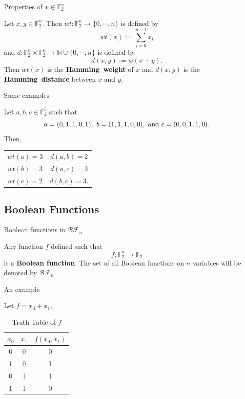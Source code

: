 \documentclass{beamer}
\def\gftwo{\mathbb{F}_2}
\def\nnn{\mathbb{N}}
\def\BF{\mathcal{BF}}
\begin{document}
\begin{frame}{Properties of $x\in\gftwo^n$}
  \begin{definition}
  \label{def:Hamming}
  	Let $x,y\in\gftwo^n$. Then $wt:\gftwo^n\rightarrow\{0,\cdots,n\}$
    is defined by
  	\[
  	  wt(x):=\sum_{i=0}^{n-1}x_i
  	\]
  	and $d:\gftwo^n\times\gftwo^n\rightarrow\nnn\cup\{0,\cdots,n\}$
    is defined by
  	\[
  	  d(x,y):=w(x+y).
  	\]
  	Then $wt(x)$ is the {\bf Hamming\ weight} of $x$ and $d(x,y)$ is the
  	{\bf Hamming\ distance} between $x$ and $y$.
  \end{definition}
\end{frame}
  
\begin{frame}{Some examples}
  \begin{example}
  	Let $a,b,c\in\gftwo^5$ such that
  	\[
  	a=(0,1,1,0,1),\ b=(1,1,1,0,0),\ {\rm and}\ c=(0,0,1,1,0).
  	\]
  	Then,
  	\begin{center}
  		\begin{tabular}{c c}
  			$wt(a)=3$&$d(a,b)=2$\\
  			$wt(b)=3$&$d(a,c)=3$\\
  			$wt(c)=2$&$d(b,c)=3$.\\
  		\end{tabular}
  	\end{center}
  \end{example}
\end{frame}

\subsection{Boolean Functions}
\begin{frame}{Boolean functions in $\BF_n$}
  \begin{definition}
  \label{def:boolean-function}
    Any function $f$ defined such that 
    \begin{equation*}
      f:\gftwo^n\rightarrow\gftwo
    \end{equation*}
    is a {\bf Boolean function}. The set of all Boolean functions on $n$
    variables will be denoted by $\BF_n$.
  \end{definition}
\end{frame}

\begin{frame}{An example}
  \begin{example}
    Let $f=x_0+x_1$.
    \begin{table}
    \label{tab:truth-table}
    	\centering
      \begin{tabular}{|c|c||c|}
        \hline
        $x_0$&$x_1$&$f(x_0,x_1)$\\
        \hline
        0&0&0\\
        1&0&1\\
        0&1&1\\
        1&1&0\\
      	\hline
    	\end{tabular}
    	\caption{Truth Table of $f$}
    \end{table}
  \end{example}
\end{frame}
\end{document}
